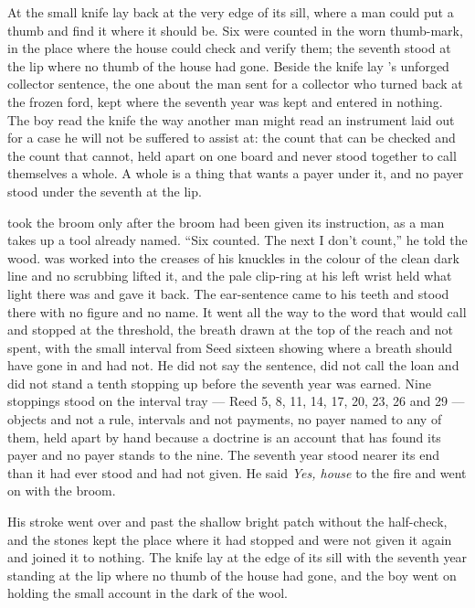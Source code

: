 \scenebreak

At  the small knife lay back at the very edge of its sill, where a man could put a thumb and find it where it should be. Six were counted in the worn thumb-mark, in the place where the house could check and verify them; the seventh stood at the lip where no thumb of the house had gone. Beside the knife lay 's unforged collector sentence, the one about the man sent for a collector who turned back at the frozen ford, kept where the seventh year was kept and entered in nothing. The boy read the knife the way another man might read an instrument laid out for a case he will not be suffered to assist at: the count that can be checked and the count that cannot, held apart on one board and never stood together to call themselves a whole. A whole is a thing that wants a payer under it, and no payer stood under the seventh at the lip.

 took the broom only after the broom had been given its instruction, as a man takes up a tool already named. “Six counted. The next I don't count,” he told the wood.  was worked into the creases of his knuckles in the colour of the clean dark line and no scrubbing lifted it, and the pale clip-ring at his left wrist held what light there was and gave it back. The ear-sentence came to his teeth and stood there with no figure and no name. It went all the way to the word that would call  and stopped at the threshold, the breath drawn at the top of the reach and not spent, with the small interval from Seed sixteen showing where a breath should have gone in and had not. He did not say the sentence, did not call the loan and did not stand a tenth stopping up before the seventh year was earned. Nine stoppings stood on the interval tray --- Reed 5, 8, 11, 14, 17, 20, 23, 26 and 29 --- objects and not a rule, intervals and not payments, no payer named to any of them, held apart by hand because a doctrine is an account that has found its payer and no payer stands to the nine. The seventh year stood nearer its end than it had ever stood and had not given. He said \emph{Yes, house} to the fire and went on with the broom.

His stroke went over  and past the shallow bright patch without the half-check, and the stones kept the place where it had stopped and were not given it again and joined it to nothing. The knife lay at the edge of its sill with the seventh year standing at the lip where no thumb of the house had gone, and the boy went on holding the small account in the dark of the wool.

